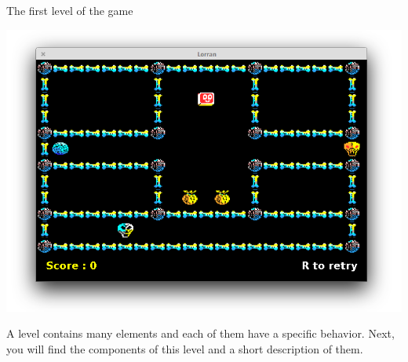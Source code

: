 \documentclass{report}
\begin{document}
\begin{center}
\textsf{The first level of the game}\par
\includegraphics[scale=0.5]{resources/lvlorann.png}
\end{center}

A level contains many elements and each of them have a specific behavior. Next, you will find the components of this level and a short description of them.
\end{document}
